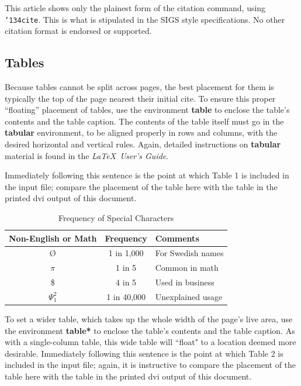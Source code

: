 \documentclass{sig-alternate-sigmod08}
\begin{document}
This article shows only the plainest form
of the citation command, using \texttt{{\char'134}cite}.
This is what is stipulated in the SIGS style specifications.
No other citation format is endorsed or supported.

\subsection{Tables}
Because tables cannot be split across pages, the best
placement for them is typically the top of the page
nearest their initial cite.  To
ensure this proper ``floating'' placement of tables, use the
environment \textbf{table} to enclose the table's contents and
the table caption.  The contents of the table itself must go
in the \textbf{tabular} environment, to
be aligned properly in rows and columns, with the desired
horizontal and vertical rules.  Again, detailed instructions
on \textbf{tabular} material
is found in the \textit{\LaTeX\ User's Guide}.

Immediately following this sentence is the point at which
Table 1 is included in the input file; compare the
placement of the table here with the table in the printed
dvi output of this document.

\begin{table}
\centering
\caption{Frequency of Special Characters}
\begin{tabular}{|c|c|l|} \hline
Non-English or Math&Frequency&Comments\\ \hline
\O & 1 in 1,000& For Swedish names\\ \hline
$\pi$ & 1 in 5& Common in math\\ \hline
\$ & 4 in 5 & Used in business\\ \hline
$\Psi^2_1$ & 1 in 40,000& Unexplained usage\\
\hline\end{tabular}
\end{table}

To set a wider table, which takes up the whole width of
the page's live area, use the environment
\textbf{table*} to enclose the table's contents and
the table caption.  As with a single-column table, this wide
table will ``float" to a location deemed more desirable.
Immediately following this sentence is the point at which
Table 2 is included in the input file; again, it is
instructive to compare the placement of the
table here with the table in the printed dvi
output of this document.
\end{document}
